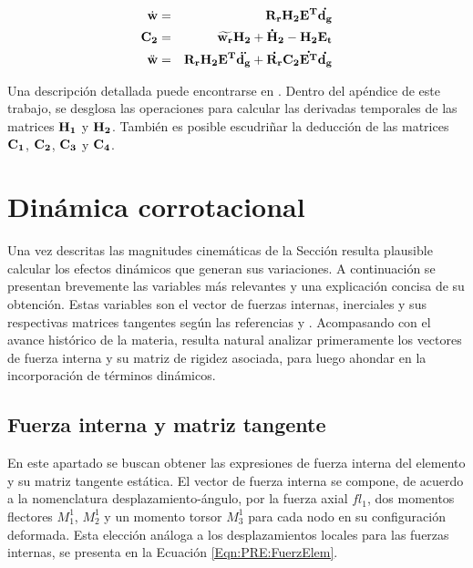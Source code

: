 \begin{eqnarray}
	\label{Eqn:PRE:VelAngular}
	\dot{\bf{w}}&=&\bf{R}_r\bf{H}_2\bf{E}^T\dot{{\bf{d_g}}}\\
	\label{Eqn:PRE:DefC}
	\bf{C}_2&=&\widetilde{\bf{w}_r}\bf{H}_2+\bf{\dot{H}_2}-\bf{H}_2\bf{E}_t\\
	\label{Eqn:PRE:AcelAngular}
	\ddot{\bf{w}}&=&\bf{R}_r\bf{H}_2\bf{E}^T\ddot{{\bf{d_g}}}+ \dot{\bf{R}_r} \bf{C}_2 \dot{\bf{E}^T} \dot{ \bf{d}_g }	
\end{eqnarray}

Una descripción detallada puede encontrarse en \cite{Le2014}. Dentro del apéndice de este trabajo, se desglosa las operaciones para calcular las derivadas temporales de las matrices $\bf{H}_1$ y $\bf{H}_2$. También es posible escudriñar la deducción de las matrices $\bf{C_1}$, $\bf{C_2}$, $\bf{C_3}$ y $\bf{C_4}$.   

\section{Dinámica corrotacional}\label{Subsec:PRE:DinamicCorrot}

Una vez descritas las magnitudes cinemáticas de la Sección \label{Subsec:PRE:CinematicCorrot} resulta plausible calcular los efectos dinámicos que generan sus variaciones. A continuación se presentan brevemente las variables más relevantes y una explicación concisa de su obtención. Estas
variables son el vector de fuerzas internas, inerciales y sus respectivas matrices tangentes según las referencias \citep{Le2014} y \citep{Battini2002}. Acompasando con el avance histórico de la materia, resulta natural analizar primeramente los vectores de fuerza interna y su matriz de rigidez asociada, para luego ahondar en la incorporación de términos dinámicos. 


\subsection{Fuerza interna y matriz tangente}\label{Sec:PRE:Interna}

En este apartado se buscan obtener las expresiones de fuerza interna del elemento y su matriz tangente estática. El vector de fuerza interna se compone, de acuerdo a la nomenclatura desplazamiento-ángulo, por la fuerza axial $fl_1$, dos momentos flectores $M^1_1$, $M^1_2$ y un momento torsor $M^1_3$ para cada nodo en su configuración deformada. Esta elección análoga a los desplazamientos locales para las fuerzas internas, se presenta en la Ecuación \eqref{Eqn:PRE:FuerzElem}. 

